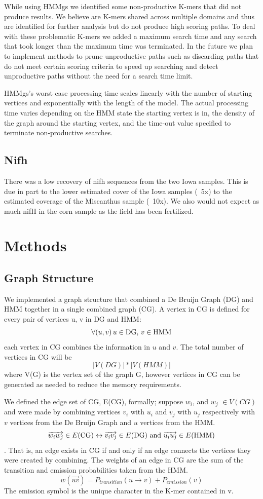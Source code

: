 \documentclass[10pt]{bmc_article}
\newenvironment{bmcformat}{\begin{raggedright}\baselineskip20pt\sloppy\setboolean{publ}{false}}{\end{raggedright}\baselineskip20pt\sloppy}
\begin{document}
\begin{bmcformat}
While using HMMgs we identified some non-productive K-mers that did not produce results. We believe are K-mers shared across multiple domains and thus are identified for further analysis but do not produce high scoring paths.  To deal with these problematic K-mers we added a maximum search time and any search that took longer than the maximum time was terminated.  In the future we plan to implement methods to prune unproductive paths such as discarding paths that do not meet certain scoring criteria to speed up searching and detect unproductive paths without the need for a search time limit.

HMMgs's worst case processing time scales linearly with the number of starting vertices and exponentially with the length of the model.  The actual processing time varies depending on the HMM state the starting vertex is in, the density of the graph around the starting vertex, and the time-out value specified to terminate non-productive searches.
\subsection*{Nifh}
There was a low recovery of nifh sequences from the two Iowa samples.  This is due in part to the lower estimated cover of the Iowa samples (~5x) to the estimated coverage of the Miscanthus sample (~10x).  We also would not expect as much nifH in the corn sample as the field has been fertilized.


  
\section*{Methods}
\subsection*{Graph Structure}
We implemented a graph structure that combined a De Bruijn Graph (DG) and HMM together in a single combined graph (CG).  A vertex in CG is defined for every pair of vertices u, v in DG and HMM:
\[ \forall (u,v)\, u\in \textnormal{DG, }v\in \textnormal{HMM} \] each vertex in CG combines the information in $u$ and $v$.
The total number of vertices in CG will be \[|V(DG)| * |V(HMM)|\] where V(G) is the vertex set of the graph G, however vertices in CG can be generated as needed to reduce the memory requirements.

We defined the edge set of CG, E(CG), formally; suppose $w_i$, and $w_j$ \(\in V(CG) \) and were made by combining vertices $v_i$ with $u_i$ and $v_j$ with $u_j$ respectively with $v$ vertices from the De Bruijn Graph and $u$ vertices from the HMM.
\[\overrightarrow{w_iw_j} \in E(\textnormal{CG}) \leftrightarrow \overrightarrow{v_iv_j} \in 
E(\textnormal{DG})\textnormal{ and } \overrightarrow{u_iu_j} \in E(\textnormal{HMM})\].
That is, an edge exists in CG if and only if an edge connects the vertices they were created by combining.
The weights of an edge  in CG are the sum of the transition and emission probabilities taken from the HMM.  
\[ w(\overrightarrow{uv}) = P_{transition}(u \rightarrow v) + P_{emission}(v) \]
The emission symbol is the unique character in the K-mer contained in v.


\end{bmcformat}
\end{document}
